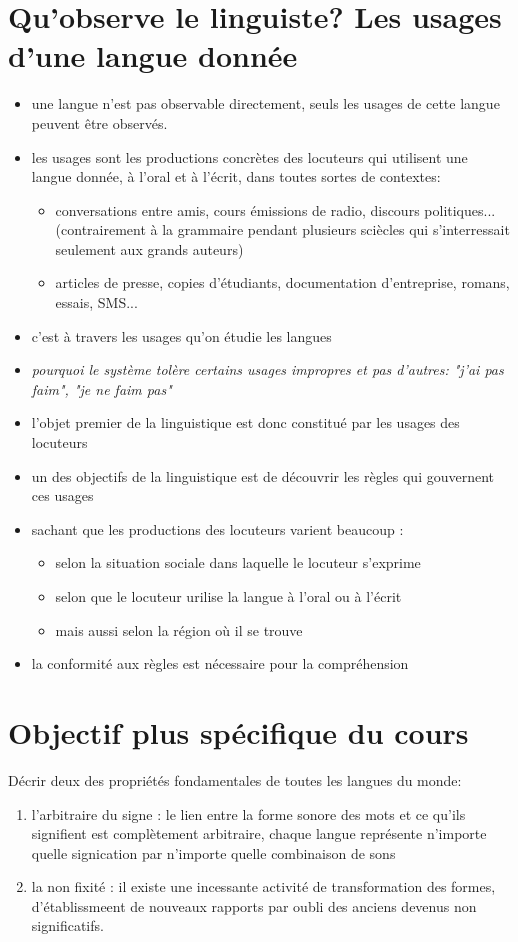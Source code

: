 \section{Qu'observe le linguiste? Les usages d'une langue donnée}
\begin{itemize}
   \item  une langue n'est pas observable directement, seuls les usages de cette langue peuvent être observés.
   \item  les usages sont les productions concrètes des locuteurs qui utilisent une langue donnée, à l'oral et à l'écrit, dans toutes sortes de contextes:
      \begin{itemize} 
         \item conversations entre amis, cours émissions de radio, discours politiques... (contrairement à la grammaire pendant plusieurs sciècles qui s'interressait seulement aux grands auteurs)
         \item articles de presse, copies d'étudiants, documentation d'entreprise, romans, essais, SMS...
      \end{itemize}
   \item  c'est à travers les usages qu'on étudie les langues
   \item \textit{pourquoi le système tolère certains usages impropres et pas d'autres: "j'ai pas faim", "je ne faim pas"}

   \item l'objet premier de la linguistique est donc constitué par les usages des locuteurs 
   \item un des objectifs de la linguistique est de découvrir les règles qui gouvernent ces usages
   \item sachant que les productions des locuteurs varient beaucoup :
      \begin{itemize} 
         \item selon la situation sociale dans laquelle le locuteur s'exprime 
         \item selon que le locuteur urilise la langue à l'oral ou à l'écrit
         \item mais aussi selon la région où il se trouve
      \end{itemize}
   \item  la conformité aux règles est nécessaire pour la compréhension
\end{itemize}
\section{Objectif plus spécifique du cours}
Décrir deux des propriétés fondamentales de toutes les langues du monde:
\begin{enumerate}
   \item l'arbitraire du signe : le lien entre la forme sonore des mots et ce qu'ils signifient est complètement arbitraire, chaque langue représente n'importe quelle signication par n'importe quelle combinaison de sons
   \item la non fixité : il existe une incessante activité de transformation des formes, d'établissmeent de nouveaux rapports par oubli des anciens devenus non significatifs.
\end{enumerate}


